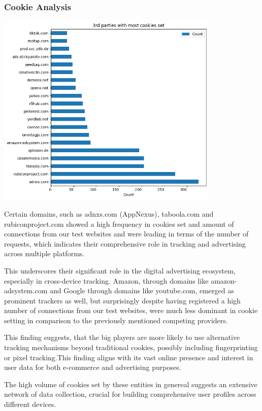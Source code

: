 \subsubsection{Cookie Analysis}
\includegraphics[width=0.8\textwidth]{./assets/thirdpartieswithmostcookiesset.png}

Certain domains, such as adnxs.com (AppNexus), taboola.com and rubiconproject.com showed a high frequency in cookies set and amount of connections from our test websites and were leading in terms of the number of requests, which indicates their comprehensive role in tracking and advertising across multiple platforms.

This underscores their significant role in the digital advertising ecosystem, especially in cross-device tracking. Amazon, through domains like amazon-adsystem.com and Google through domains like youtube.com, emerged as prominent trackers as well, but surprisingly despite having registered a high number of connections from our test websites, were much less dominant in cookie setting in comparison to the previously mentioned competing providers. 

This finding suggests, that the big players are more likely to use alternative tracking mechanisms beyond traditional cookies, possibly including fingerprinting or pixel tracking.This finding aligns with its vast online presence and interest in user data for both e-commerce and advertising purposes.

The high volume of cookies set by these entities in genereal suggests an extensive network of data collection, crucial for building comprehensive user profiles across different devices.


